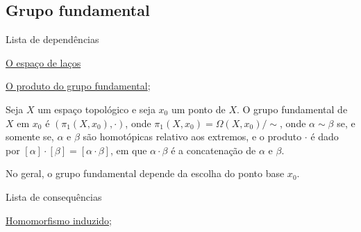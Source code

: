 \subsection{Grupo fundamental}
\label{grupo-fundamental-def}
\begin{titlemize}{Lista de dependências}
	\item \hyperref[espaco-lacos-def]{O espaço de laços}
	\item \hyperref[produto-bem-definido-prop]{O produto do grupo fundamental};\\ %
\end{titlemize}
\begin{defi}
    Seja $X$ um espaço topológico e seja $x_0$ um ponto de $X.$ O grupo fundamental de $X$ em $x_0$ é $(\pi_1(X,x_0),\cdot)$, onde $\pi_1(X,x_0) = \Omega(X,x_0)/\sim$, onde $\alpha \sim \beta$ se, e somente se, $\alpha$ e $\beta$ são homotópicas relativo aos extremos, e o produto $\cdot$ é dado por $[\alpha]\cdot[\beta] = [\alpha \cdot \beta]$, em que $\alpha \cdot \beta$ é a concatenação de $\alpha$ e $\beta$.
\end{defi}

No geral, o grupo fundamental depende da escolha do ponto base $x_0$.

\begin{titlemize}{Lista de consequências}
	\item \hyperref[hom-grupo-fundamental]{Homomorfismo induzido};%
\end{titlemize}
